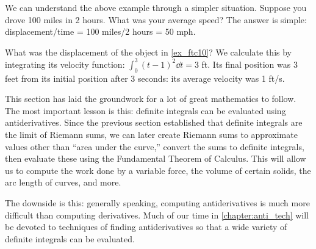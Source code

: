 We can understand the above example through a simpler situation. Suppose you drove 100 miles in 2 hours. What was your average speed? The answer is simple: displacement/time = 100 miles/2 hours = 50 mph.

What was the displacement of the object in \autoref{ex_ftc10}? We calculate this by integrating its velocity function: $\int_0^3 (t-1)^2\dd t = 3$ ft. Its final position was 3 feet from its initial position after 3 seconds: its average velocity was 1 ft/s.\bigskip

This section has laid the groundwork for a lot of great mathematics to follow. The most important lesson is this: definite integrals can be evaluated using antiderivatives. Since the previous section established that definite integrals are the limit of Riemann sums, we can later create Riemann sums to approximate values other than ``area under the curve,'' convert the sums to definite integrals, then evaluate these using the Fundamental Theorem of Calculus. This will allow us to compute the work done by a variable force, the volume of certain solids, the arc length of curves, and more.

The downside is this: generally speaking, computing antiderivatives is much more difficult than computing derivatives. Much of our time in \autoref{chapter:anti_tech} will be devoted to techniques of finding antiderivatives so that a wide variety of definite integrals can be evaluated.

